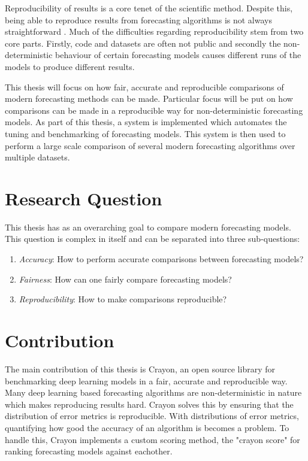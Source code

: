Reproducibility of results is a core tenet of the scientific method. Despite this, being able to reproduce results from forecasting algorithms is not always straightforward \cite{makridakis_m4_2020}. Much of the difficulties regarding reproducibility stem from two core parts. Firstly, code and datasets are often not public and secondly the non-deterministic behaviour of certain forecasting models causes different runs of the models to produce different results. 

This thesis will focus on how fair, accurate and reproducible comparisons of modern forecasting methods can be made. Particular focus will be put on how comparisons can be made in a reproducible way for non-deterministic forecasting models. As part of this thesis, a system is implemented which automates the tuning and benchmarking of forecasting models. This system is then used to perform a large scale comparison of several modern forecasting algorithms over multiple datasets.

\section{Research Question}
This thesis has as an overarching goal to compare modern forecasting models. This question is complex in itself and can be separated into three sub-questions:

\begin{enumerate}
\item \textit{Accuracy}: How to perform accurate comparisons between forecasting models?
\item \textit{Fairness}: How can one fairly compare forecasting models?
\item \textit{Reproducibility}: How to make comparisons reproducible? 
\end{enumerate}

\section{Contribution}
\label{section:contribution}

The main contribution of this thesis is Crayon, an open source library for benchmarking deep learning models in a fair, accurate and reproducible way. Many deep learning based forecasting algorithms are non-deterministic in nature which makes reproducing results hard. Crayon solves this by ensuring that the distribution of error metrics is reproducible. With distributions of error metrics, quantifying how good the accuracy of an algorithm is becomes a problem. To handle this, Crayon implements a custom scoring method, the "crayon score" for ranking forecasting models against eachother. 

